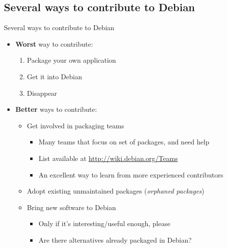 \documentclass[10pt,final]{beamer}
\begin{document}
\subsection{Several ways to contribute to Debian}
\begin{frame}{Several ways to contribute to Debian}
  \begin{itemize}
  \item \textbf{Worst} way to contribute:
    \begin{enumerate}
    \item Package your own application
    \item Get it into Debian
    \item Disappear
    \end{enumerate}
    \br
  \item \textbf{Better} ways to contribute:
	  \begin{itemize}
		  \item Get involved in packaging teams
    \begin{itemize}
    \item Many teams that focus on set of packages, and need help
    \item List available at \url{http://wiki.debian.org/Teams}
    \item An excellent way to learn from more experienced contributors
    \end{itemize}
    \br
\item Adopt existing unmaintained packages (\textsl{orphaned packages})
    \br
  \item Bring new software to Debian
    \begin{itemize}
    \item Only if it's interesting/useful enough, please
    \item Are there alternatives already packaged in Debian?
    \end{itemize}
  \end{itemize}

  \end{itemize}
\end{frame}
\end{document}
